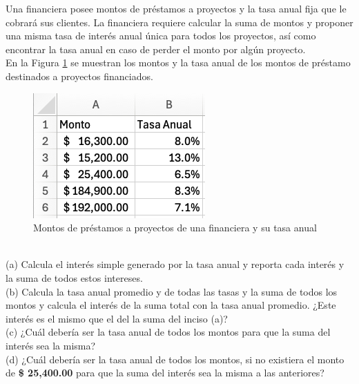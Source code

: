 \documentclass{article}
\begin{document}
Una financiera posee montos de préstamos a proyectos y la tasa anual fija que le cobrará sus clientes. La financiera requiere calcular la suma de montos y proponer una misma tasa de interés anual única para todos los proyectos, así como encontrar la tasa anual en caso de perder el monto por algún proyecto.
\\[12pt]
En la Figura \ref{fig:p105} se muestran los montos y la tasa anual de los montos de préstamo destinados a proyectos financiados.
\begin{figure}[!ht]
    \centering
    \begin{minipage}{\textwidth}
        \centering
        \includegraphics[width=\textwidth]{figures/p105.png}
    \end{minipage}
    \captionsetup{width=0.9\textwidth}
    \caption{Montos de préstamos a proyectos de una financiera y su tasa anual}
    \label{fig:p105}
\end{figure}
\\

\noindent
(a) Calcula el interés simple generado por la tasa anual y reporta cada interés y la suma de todos estos intereses. 
\\[6pt]
(b) Calcula la tasa anual promedio y de todas las tasas y la suma de todos los montos y calcula el interés de la suma total con la tasa anual promedio. ¿Este interés es el mismo que el del la suma del inciso (a)?
\\[6pt]
(c) ¿Cuál debería ser la tasa anual de todos los montos para que la suma del interés sea la misma?
\\[6pt]
(d) ¿Cuál debería ser la tasa anual de todos los montos, si no existiera el monto de \textbf{\$ 25,400.00} para que la suma del interés sea la misma a las anteriores?
\end{document}
